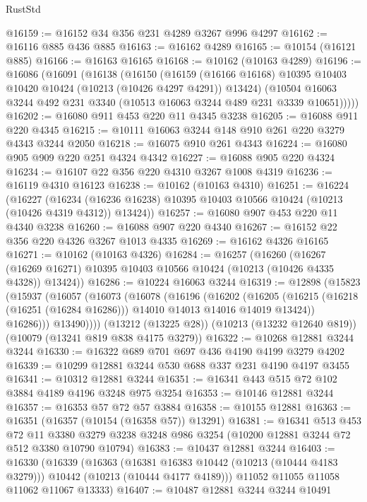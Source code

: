 \begin{lexlean}{RustStd}
\begin{coremodule}
{\begin{coremodule}
{{{{{{{{{{{{{{{{{{{{{{{{{{@16159 := @16152 @34 @356 @231 @4289 @3267 @996 @4297
@16162 := @16116 @885 @436 @885
@16163 := @16162 @4289
@16165 := @10154 (@16121 @885)
@16166 := @16163 @16165
@16168 := @10162 (@10163 @4289)
@16196 := @16086
    (@16091
      (@16138
        (@16150
          (@16159 (@16166 @16168) @10395 @10403 @10420 @10424 (@10213 (@10426 @4297 @4291)) @13424)
          (@10504 @16063 @3244 @492 @231 @3340 (@10513 @16063 @3244 @489 @231 @3339 @10651)))))
@16202 := @16080 @911 @453 @220 @11 @4345 @3238
@16205 := @16088 @911 @220 @4345
@16215 := @10111 @16063 @3244 @148 @910 @261 @220 @3279 @4343 @3244 @2050
@16218 := @16075 @910 @261 @4343
@16224 := @16080 @905 @909 @220 @251 @4324 @4342
@16227 := @16088 @905 @220 @4324
@16234 := @16107 @22 @356 @220 @4310 @3267 @1008 @4319
@16236 := @16119 @4310 @16123
@16238 := @10162 (@10163 @4310)
@16251 := @16224
    (@16227
      (@16234 (@16236 @16238) @10395 @10403 @10566 @10424 (@10213 (@10426 @4319 @4312)) @13424))
@16257 := @16080 @907 @453 @220 @11 @4340 @3238
@16260 := @16088 @907 @220 @4340
@16267 := @16152 @22 @356 @220 @4326 @3267 @1013 @4335
@16269 := @16162 @4326 @16165
@16271 := @10162 (@10163 @4326)
@16284 := @16257
    (@16260
      (@16267 (@16269 @16271) @10395 @10403 @10566 @10424 (@10213 (@10426 @4335 @4328)) @13424))
@16286 := @10224 @16063 @3244
@16319 := @12898
    (@15823
      (@15937
        (@16057
          (@16073
            (@16078
              (@16196
                (@16202
                  (@16205
                    (@16215 (@16218 (@16251 (@16284 @16286))) @14010 @14013 @14016 @14019 @13424))
                  @16286)))
            @13490))))
    (@13212 (@13225 @28))
    (@10213 (@13232 @12640 @819))
    (@10079 (@13241 @819 @838 @4175 @3279))
@16322 := @10268 @12881 @3244 @3244
@16330 := @16322 @689 @701 @697 @436 @4190 @4199 @3279 @4202
@16339 := @10299 @12881 @3244 @530 @688 @337 @231 @4190 @4197 @3455
@16341 := @10312 @12881 @3244
@16351 := @16341 @443 @515 @72 @102 @3884 @4189 @4196 @3248 @975 @3254
@16353 := @10146 @12881 @3244
@16357 := @16353 @57 @72 @57 @3884
@16358 := @10155 @12881
@16363 := @16351 (@16357 (@10154 (@16358 @57)) @13291)
@16381 := @16341
    @513
    @453
    @72
    @11
    @3380
    @3279
    @3238
    @3248
    @986
    @3254
    (@10200 @12881 @3244 @72 @512 @3380 @10790 @10794)
@16383 := @10437 @12881 @3244
@16403 := @16330
    (@16339
      (@16363
        (@16381 @16383 @10442 (@10213 (@10444 @4183 @3279)))
        @10442
        (@10213 (@10444 @4177 @4189)))
      @11052
      @11055
      @11058
      @11062
      @11067
      @13333)
@16407 := @10487 @12881 @3244 @3244 @10491
}}}}}}}}}}}}}}}}}}}}}}}}}}
\end{coremodule}}
\end{coremodule}
\end{lexlean}
